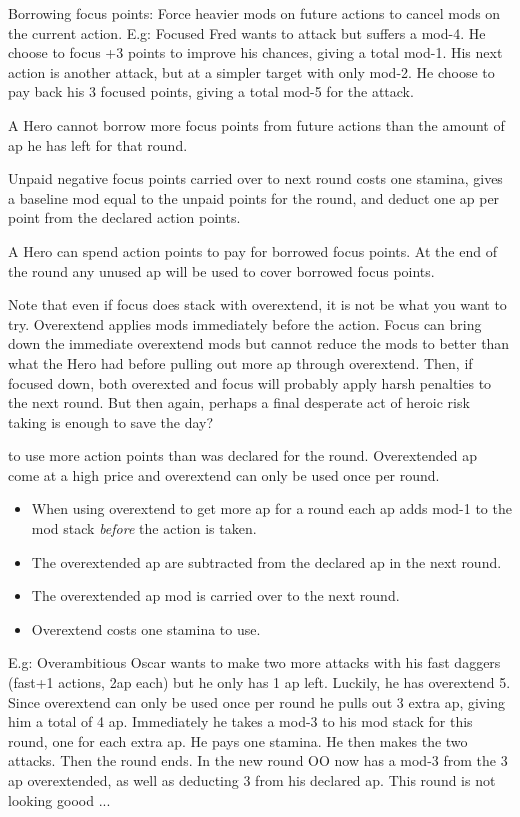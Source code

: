 Borrowing focus points: Force heavier mods on future actions to cancel mods on the current action. E.g: Focused Fred wants to attack but suffers a mod-4. He choose to focus +3 points to improve his chances, giving a total mod-1. His next action is another attack, but at a simpler target with only mod-2. He choose to pay back his 3 focused points, giving a total mod-5 for the attack.

A Hero cannot borrow more focus points from future actions than the amount of ap he has left for that round.

Unpaid negative focus points carried over to next round costs one stamina, gives a baseline mod equal to the unpaid points for the round, and deduct one ap per point from the declared action points.

A Hero can spend action points to pay for borrowed focus points. At the end of the round any unused ap will be used to cover borrowed focus points.

Note that even if focus does stack with overextend, it is not be what you want to try. Overextend applies mods immediately before the action. Focus can bring down the immediate overextend mods but cannot reduce the mods to better than what the Hero had before pulling out more ap through overextend. Then, if focused down, both overexted and focus will probably apply harsh penalties to the next round. But then again, perhaps a final desperate act of heroic risk taking is enough to save the day?


 to use more action points than was declared for the round. Overextended ap come at a high price and overextend can only be used once per round.
\begin{itemize}
    \item When using overextend to get more ap for a round each ap adds mod-1 to the mod stack \emph{before} the action is taken.
    \item The overextended ap are subtracted from the declared ap in the next round.
    \item The overextended ap mod is carried over to the next round.
    \item Overextend costs one stamina to use.
\end{itemize}

E.g: Overambitious Oscar wants to make two more attacks with his fast daggers (fast+1 actions, 2ap each) but he only has 1 ap left. Luckily, he has overextend 5. Since overextend can only be used once per round he pulls out 3 extra ap, giving him a total of 4 ap. Immediately he takes a mod-3 to his mod stack for this round, one for each extra ap. He pays one stamina. He then makes the two attacks. Then the round ends. In the new round OO now has a mod-3 from the 3 ap overextended, as well as deducting 3 from his declared ap. This round is not looking goood ...


